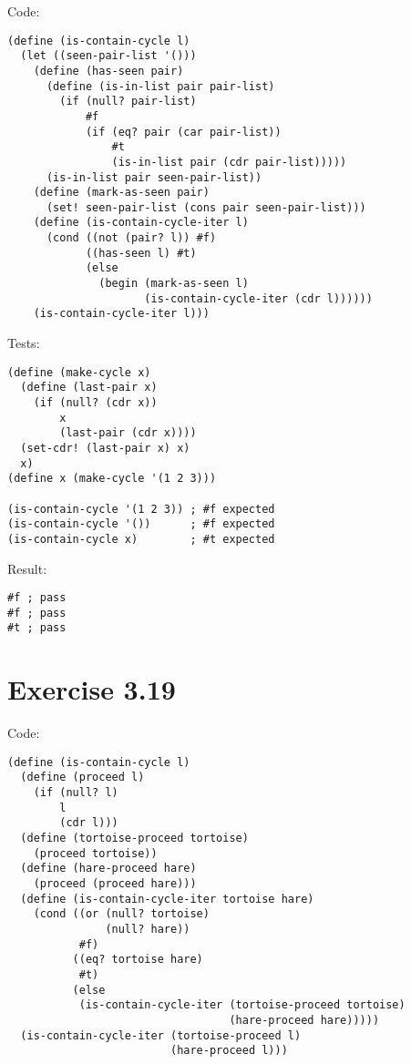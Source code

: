 \documentclass[../main.tex]{subfiles}
\begin{document}
Code:

\begin{lstlisting}
(define (is-contain-cycle l)
  (let ((seen-pair-list '()))
    (define (has-seen pair)
      (define (is-in-list pair pair-list)
        (if (null? pair-list)
            #f
            (if (eq? pair (car pair-list))
                #t
                (is-in-list pair (cdr pair-list)))))
      (is-in-list pair seen-pair-list))
    (define (mark-as-seen pair)
      (set! seen-pair-list (cons pair seen-pair-list)))
    (define (is-contain-cycle-iter l)
      (cond ((not (pair? l)) #f)
            ((has-seen l) #t)
            (else
              (begin (mark-as-seen l)
                     (is-contain-cycle-iter (cdr l))))))
    (is-contain-cycle-iter l)))
\end{lstlisting}

Tests:

\begin{lstlisting}
(define (make-cycle x)
  (define (last-pair x)
    (if (null? (cdr x))
        x
        (last-pair (cdr x))))
  (set-cdr! (last-pair x) x)
  x)
(define x (make-cycle '(1 2 3)))

(is-contain-cycle '(1 2 3)) ; #f expected
(is-contain-cycle '())      ; #f expected
(is-contain-cycle x)        ; #t expected
\end{lstlisting}

Result:

\begin{lstlisting}
#f ; pass
#f ; pass
#t ; pass
\end{lstlisting}

\section{Exercise 3.19}

Code:

\begin{lstlisting}
(define (is-contain-cycle l)
  (define (proceed l)
    (if (null? l)
        l
        (cdr l)))
  (define (tortoise-proceed tortoise)
    (proceed tortoise))
  (define (hare-proceed hare)
    (proceed (proceed hare)))
  (define (is-contain-cycle-iter tortoise hare)
    (cond ((or (null? tortoise)
               (null? hare))
           #f)
          ((eq? tortoise hare)
           #t)
          (else
           (is-contain-cycle-iter (tortoise-proceed tortoise)
                                  (hare-proceed hare)))))
  (is-contain-cycle-iter (tortoise-proceed l)
                         (hare-proceed l)))
\end{lstlisting}
\end{document}
